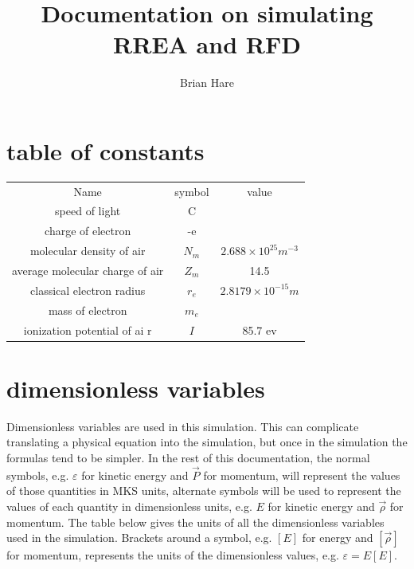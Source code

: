 \documentclass[]{article}
\title{Documentation on simulating RREA and RFD}
\author{Brian Hare}
\begin{document}
\maketitle



\section{table of constants}

\begin{center}
	\begin{tabular}{ c c c }
		Name                            & symbol    &   value  \\ 
		speed of light                  & C         &         \\  
		charge of electron              & -e        &         \\  
		molecular density of air        & $N_m$     &   $2.688\times 10^{25} m^{-3} $     \\  
		average molecular charge of air & $Z_m$     &  14.5       \\  
		classical electron radius       & $r_e$     &   $2.8179\times 10^{-15} m $      \\  
        mass of electron                & $m_e$     &     \\
        ionization potential of ai  r   & $I$       &  85.7 ev    \\  
	\end{tabular}
\end{center}


\section{dimensionless variables}

Dimensionless variables are used in this simulation. This can complicate translating a physical equation into the simulation, but once in the simulation the formulas tend to be simpler. In the rest of this documentation, the normal symbols, e.g. $\varepsilon$ for kinetic energy and $ \vec{P} $ for momentum, will represent the values of those quantities in MKS units, alternate symbols will be used to represent the values of each quantity in dimensionless units, e.g. $E$ for kinetic energy and $\vec{\rho} $ for momentum. The table below gives the units of all the dimensionless variables used in the simulation. Brackets around a symbol, e.g.  $\left[ E\right] $ for energy and $\left[  \vec{\rho} \right] $ for momentum, represents the units of the dimensionless values, e.g. $\varepsilon = E \left[ E \right] $.
\end{document}
